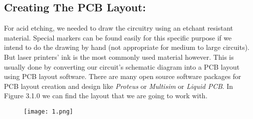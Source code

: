 \subsection{Creating The PCB Layout:}

For acid etching, we needed to draw the circuitry using an etchant resistant material. Special markers can be found easily for this specific purpose if we intend to do the drawing by hand (not appropriate for medium to large circuits). But laser printers' ink is the most commonly used material however. This is usually done by converting our circuit's schematic diagram into a PCB layout using PCB layout software. There are many open source software packages for PCB layout creation and design like {\itshape Proteus} or {\itshape Multisim} or {\itshape Liquid PCB}. In Figure 3.1.0 we can find the layout that we are going to work with. \hfill \break

\begin{figure}[H]
\texttt{[image: 1.png]}
\centering \linebreak {}
\end{figure}